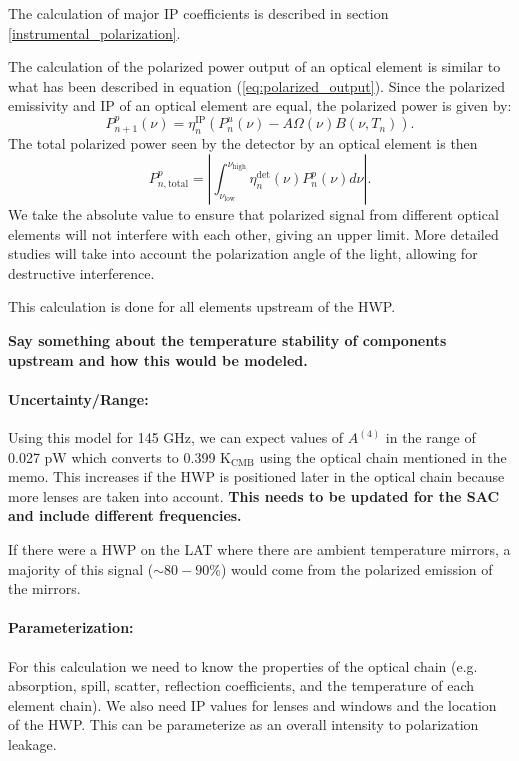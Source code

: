 The calculation of major IP coefficients is described in section \ref{instrumental_polarization}.


The calculation of the polarized power output of an optical element is similar to what has been described in equation (\ref{eq:polarized_output}).
Since the polarized emissivity and IP of an optical element are equal, the polarized power is given by:
\begin{equation}
P^p_{n+1}(\nu) = \eta^\text{IP}_n \left(P_n^u (\nu) - A\Omega(\nu) B(\nu, T_n) \right).
\end{equation}
The total polarized power seen by the detector by an optical element is then
\begin{equation}
P^p_{n, \text{total}} = \left|\int_{\nu_\text{low}}^{\nu_\text{high}} \eta_n^\text{det}(\nu) P^p_n(\nu) d\nu\right|.
\end{equation}
We take the absolute value to ensure that polarized signal from different optical elements will not interfere
with each other, giving an upper limit.
More detailed studies will take into account the polarization angle of the light, allowing for destructive interference.

This calculation is done for all elements upstream of the HWP.

\textbf{Say something about the temperature stability of components upstream and how this would be modeled.}

\paragraph{Uncertainty/Range:}
Using this model for 145 GHz, we can expect values of $A^{(4)}$ in the range of 0.027 pW which converts to 0.399 K$_\text{CMB}$ using the optical chain mentioned in the memo. This increases if the HWP is positioned later in the optical chain because more lenses are taken into account.
\textbf{This needs to be updated for the SAC and include different frequencies.}

If there were a HWP on the LAT where there are ambient temperature mirrors, a majority of this signal ($\sim 80-90\%$) would come from the polarized emission of the mirrors.

\paragraph{Parameterization:}
For this calculation we need to know the properties of the optical chain (e.g. absorption, spill, scatter, reflection coefficients, and 
the temperature of each element chain). We also need IP values for lenses and windows and the location of the HWP. This can be parameterize as an overall intensity to polarization leakage.


